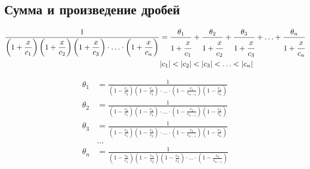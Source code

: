 
\subsection{Сумма и произведение дробей}

\begin{equation*} \begin{aligned}
\frac{1}
{
  \left(1 + \displaystyle \frac{x}{c_1} \right)
  \left(1 + \displaystyle \frac{x}{c_2} \right)
  \left(1 + \displaystyle \frac{x}{c_3} \right)
  \cdot \ldots \cdot
  \left(1 + \displaystyle \frac{x}{c_n} \right)
} &
= \frac{\theta_1}{1 + \cfrac{x}{c_1}}
+ \frac{\theta_2}{1 + \cfrac{x}{c_2}}
+ \frac{\theta_3}{1 + \cfrac{x}{c_3}}
+ \ldots
+ \frac{\theta_n}{1 + \cfrac{x}{c_n}} \\
&|c_1| < |c_2| < |c_3| < \ldots < |c_n| \\
\end{aligned} \end{equation*}

\begin{equation*} \begin{aligned}
\theta_1 &= \frac{1}
{
  \left(1 - \displaystyle \frac{c_1}{c_2} \right)
  \left(1 - \displaystyle \frac{c_1}{c_3} \right)
  \cdot \ldots \cdot
  \left(1 - \displaystyle \frac{c_1}{c_{n - 1}} \right)
  \left(1 - \displaystyle \frac{c_1}{c_n} \right)
} \\
\theta_2 &= \frac{1}
{
  \left(1 - \displaystyle \frac{c_2}{c_1} \right)
  \left(1 - \displaystyle \frac{c_2}{c_3} \right)
  \cdot \ldots \cdot
  \left(1 - \displaystyle \frac{c_2}{c_{n - 1}} \right)
  \left(1 - \displaystyle \frac{c_2}{c_n} \right)
} \\
\theta_3 &= \frac{1}
{
  \left(1 - \displaystyle \frac{c_3}{c_1} \right)
  \left(1 - \displaystyle \frac{c_3}{c_2} \right)
  \cdot \ldots \cdot
  \left(1 - \displaystyle \frac{c_3}{c_{n - 1}} \right)
  \left(1 - \displaystyle \frac{c_3}{c_n} \right)
} \\
&\ldots \\
\theta_n &= \frac{1}
{
  \left(1 - \displaystyle \frac{c_n}{c_1} \right)
  \left(1 - \displaystyle \frac{c_n}{c_2} \right)
  \left(1 - \displaystyle \frac{c_n}{c_3} \right)
  \cdot \ldots \cdot
  \left(1 - \displaystyle \frac{c_n}{c_{n - 1}} \right)
} \\
\end{aligned} \end{equation*}

